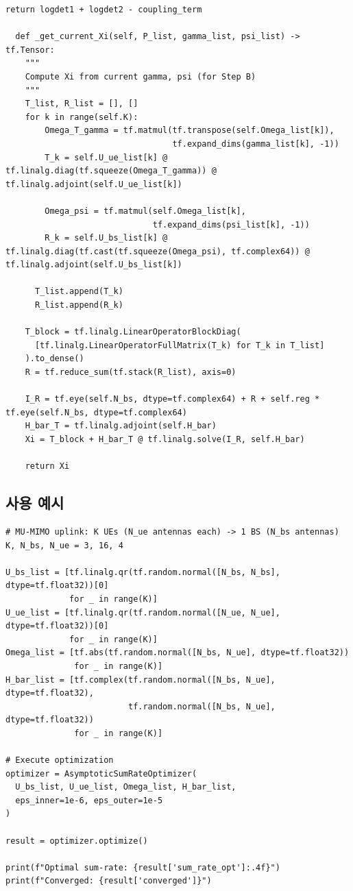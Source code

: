 \documentclass[10pt]{article}
\begin{document}
\begin{lstlisting}[caption={Main Optimization Loop}]
    return logdet1 + logdet2 - coupling_term
  
  def _get_current_Xi(self, P_list, gamma_list, psi_list) -> tf.Tensor:
    """
    Compute Xi from current gamma, psi (for Step B)
    """
    T_list, R_list = [], []
    for k in range(self.K):
        Omega_T_gamma = tf.matmul(tf.transpose(self.Omega_list[k]), 
                                  tf.expand_dims(gamma_list[k], -1))
        T_k = self.U_ue_list[k] @ tf.linalg.diag(tf.squeeze(Omega_T_gamma)) @ tf.linalg.adjoint(self.U_ue_list[k])
        
        Omega_psi = tf.matmul(self.Omega_list[k], 
                              tf.expand_dims(psi_list[k], -1))
        R_k = self.U_bs_list[k] @ tf.linalg.diag(tf.cast(tf.squeeze(Omega_psi), tf.complex64)) @ tf.linalg.adjoint(self.U_bs_list[k])
      
      T_list.append(T_k)
      R_list.append(R_k)
    
    T_block = tf.linalg.LinearOperatorBlockDiag(
      [tf.linalg.LinearOperatorFullMatrix(T_k) for T_k in T_list]
    ).to_dense()
    R = tf.reduce_sum(tf.stack(R_list), axis=0)
    
    I_R = tf.eye(self.N_bs, dtype=tf.complex64) + R + self.reg * tf.eye(self.N_bs, dtype=tf.complex64)
    H_bar_T = tf.linalg.adjoint(self.H_bar)
    Xi = T_block + H_bar_T @ tf.linalg.solve(I_R, self.H_bar)
    
    return Xi
\end{lstlisting}

\newpage
\subsection{사용 예시}

\begin{lstlisting}[caption={Usage Example}]
# MU-MIMO uplink: K UEs (N_ue antennas each) -> 1 BS (N_bs antennas)
K, N_bs, N_ue = 3, 16, 4

U_bs_list = [tf.linalg.qr(tf.random.normal([N_bs, N_bs], dtype=tf.float32))[0] 
             for _ in range(K)]
U_ue_list = [tf.linalg.qr(tf.random.normal([N_ue, N_ue], dtype=tf.float32))[0] 
             for _ in range(K)]
Omega_list = [tf.abs(tf.random.normal([N_bs, N_ue], dtype=tf.float32)) 
              for _ in range(K)]
H_bar_list = [tf.complex(tf.random.normal([N_bs, N_ue], dtype=tf.float32),
                         tf.random.normal([N_bs, N_ue], dtype=tf.float32))
              for _ in range(K)]

# Execute optimization
optimizer = AsymptoticSumRateOptimizer(
  U_bs_list, U_ue_list, Omega_list, H_bar_list,
  eps_inner=1e-6, eps_outer=1e-5
)

result = optimizer.optimize()

print(f"Optimal sum-rate: {result['sum_rate_opt']:.4f}")
print(f"Converged: {result['converged']}")
\end{lstlisting}
\end{document}
